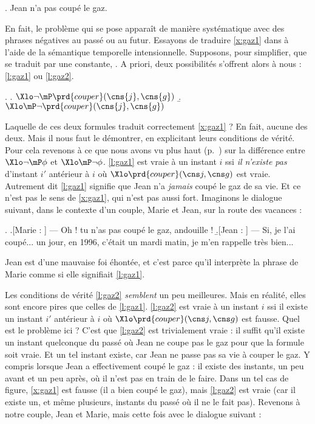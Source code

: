\ex.  \label{x:gaz1}
Jean n'a pas coupé le gaz.


En fait, le problème qui se pose apparaît de manière systématique
avec des phrases négatives au passé ou au futur.
Essayons de traduire \ref{x:gaz1} dans {\LO} à l'aide de la
sémantique temporelle intensionnelle.
Supposons, pour simplifier, que  se traduit par une
constante, . A priori, deux possibilités s'offrent alors à nous :
\ref{l:gaz1} ou \ref{l:gaz2}.

\ex.  
\a. \label{l:gaz1}
\(\Xlo\neg\mP\prd{couper}(\cns{j},\cns{g})\)
\b. 
\label{l:gaz2}
\(\Xlo\mP\neg\prd{couper}(\cns{j},\cns{g})\)


Laquelle de ces deux formules traduit correctement \ref{x:gaz1} ?  En fait, aucune des deux. Mais il nous faut le
démontrer, en explicitant leurs conditions de vérité.
Pour cela revenons à ce que nous avons vu plus haut (p.~\pageref{negPF}) sur la différence entre $\Xlo\neg\mP\phi$ et $\Xlo\mP\neg\phi$. 
\ref{l:gaz1} est vraie à un instant $i$ ssi \emph{il n'existe pas} d'instant $i'$ antérieur à $i$  où $\Xlo\prd{couper}(\cns j,\cns g)$ est vraie. 
Autrement dit \ref{l:gaz1} signifie que Jean n'a \emph{jamais} coupé le gaz de sa vie. 
Et ce n'est pas le sens de \ref{x:gaz1}, qui n'est pas aussi fort. Imaginons le dialogue suivant, dans le contexte d'un couple, Marie et Jean, sur la route des vacances :

\ex. 
\a.[Marie : ] --- Oh ! tu n'as pas coupé le gaz, andouille !
\b.[Jean : ] --- Si, je l'ai coupé... un jour, en 1996, c'était un mardi matin,
je m'en rappelle très bien...

Jean est d'une mauvaise foi éhontée, et c'est parce qu'il interprète la phrase de Marie comme si elle signifiait \ref{l:gaz1}.


Les conditions de vérité \ref{l:gaz2} \emph{semblent} un peu meilleures. 
Mais en réalité, elles sont encore pires que celles de \ref{l:gaz1}. 
\ref{l:gaz2} est vraie à un instant $i$ ssi il existe un instant $i'$ antérieur à $i$  où $\Xlo\prd{couper}(\cns j,\cns g)$ est fausse.
Quel est le problème ici ?  C'est que \ref{l:gaz2} est trivialement
vraie : il suffit qu'il existe un instant  quelconque du passé où Jean
ne coupe pas le gaz pour que la formule soit vraie.  Et un tel instant
existe, car Jean ne passe pas sa vie à couper le gaz. 
Y compris lorsque Jean a effectivement coupé le gaz : il existe des instants, un peu avant et un peu après, où il n'est pas en train de le faire. 
Dans un tel cas de figure, \ref{x:gaz1} est fausse (il a bien coupé le gaz), mais \ref{l:gaz2} est vraie (car il existe un, et même plusieurs, instants du passé où il ne le fait pas).
Revenons à notre couple, Jean et Marie, mais cette fois avec le dialogue suivant :

